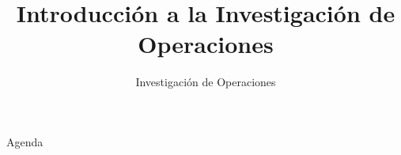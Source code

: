 \documentclass[../main.tex]{subfiles}
\title{Introducción a la Investigación de Operaciones}
\subtitle{Investigación de Operaciones} %
\begin{document}
\begin{frame}
  \maketitle
\end{frame}


     \begin{frame}{Agenda}
   \tableofcontents
 \end{frame}






\begin{frame}
  \maketitle
\end{frame}
\end{document}
